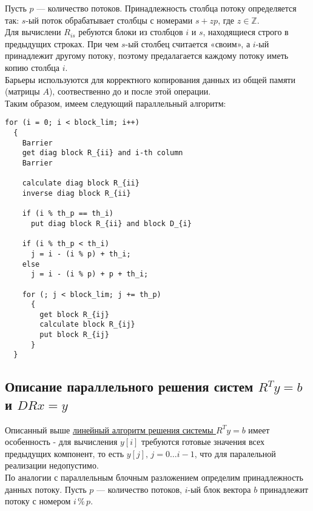 \documentclass[a4paper,12pt]{article}
\begin{document}
    Пусть $p$ --- количество потоков. Принадлежность столбца потоку определяется так:
    $s$-ый поток обрабатывает столбцы с номерами $s + zp$, где $z \in \mathbb{Z}$. \\
    
    Для вычислени $R_{is}$ ребуются блоки из столбцов $i$ и $s$, находящиеся строго в предыдущих строках. При чем $s$-ый столбец считается «своим», а $i$-ый принадлежит 
    другому потоку, поэтому предалагается каждому потоку иметь копию столбца $i$. \\
    
    Барьеры используются для корректного копирования данных из общей памяти (матрицы $A$),
    соотвественно до и после этой операции. \\
    
    Таким образом, имеем 
    \hypertarget{paral_alg}{следующий параллельный алгоритм}: 

\begin{verbatim}
for (i = 0; i < block_lim; i++)
  {
    Barrier
    get diag block R_{ii} and i-th column
    Barrier
    
    calculate diag block R_{ii}
    inverse diag block R_{ii}
    
    if (i % th_p == th_i)
      put diag block R_{ii} and block D_{i}
        
    if (i % th_p < th_i)
      j = i - (i % p) + th_i;
    else
      j = i - (i % p) + p + th_i;
        
    for (; j < block_lim; j += th_p)
      {
        get block R_{ij}
        calculate block R_{ij}
        put block R_{ij}
      }
  }
\end{verbatim}


\subsection{Описание параллельного решения систем $R^T y = b$ и $DRx = y$}

    Описанный выше 
    \hyperlink{calc_y}{линейный алгоритм решения системы $R^T y = b$} 
    имеет особенность - для вычисления $y[i]$ 
    \hypertarget{reason}{требуются готовые значения всех предыдущих компонент}, 
    то есть $y[j],\, j = 0 \dots i-1$, что для паралельной реализации недопустимо. \\
    
    По аналогии с параллельным блочным разложением определим принадлежность данных потоку.
    Пусть $p$ --- количество потоков, $i$-ый блок вектора $b$ принадлежит потоку 
    с номером $i\,\%\, p$. \\
    
\end{document}
